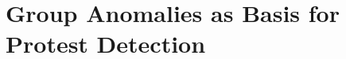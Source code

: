 \chapter{Group Anomalies as Basis for Protest Detection}
\label{ch:absenteeism}
\begingroup
\newcommand{\score}{S}
\newcommand{\myalgo}{CoolAlgo}






%










\endgroup
